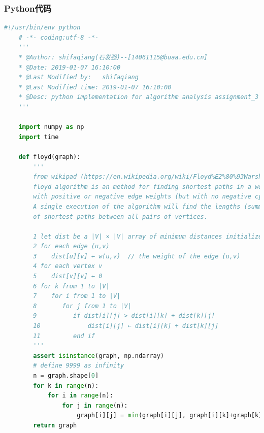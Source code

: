 \documentclass[a4paper,12pt]{article}
\begin{document}
\subsubsection{Python代码}
\begin{lstlisting}[language=Python]
    #!/usr/bin/env python
    # -*- coding:utf-8 -*-
    '''
    * @Author: shifaqiang(石发强)--[14061115@buaa.edu.cn] 
    * @Date: 2019-01-07 16:10:00 
    * @Last Modified by:   shifaqiang 
    * @Last Modified time: 2019-01-07 16:10:00 
    * @Desc: python implementation for algorithm analysis assignment_3
    '''

    import numpy as np
    import time

    def floyd(graph):
        '''
        from wikipad (https://en.wikipedia.org/wiki/Floyd%E2%80%93Warshall_algorithm),
        floyd algorithm is an method for finding shortest paths in a weighted graph 
        with positive or negative edge weights (but with no negative cycles).
        A single execution of the algorithm will find the lengths (summed weights) 
        of shortest paths between all pairs of vertices. 

        1 let dist be a |V| × |V| array of minimum distances initialized to ∞ (infinity)
        2 for each edge (u,v)
        3    dist[u][v] ← w(u,v)  // the weight of the edge (u,v)
        4 for each vertex v
        5    dist[v][v] ← 0
        6 for k from 1 to |V|
        7    for i from 1 to |V|
        8       for j from 1 to |V|
        9          if dist[i][j] > dist[i][k] + dist[k][j] 
        10             dist[i][j] ← dist[i][k] + dist[k][j]
        11         end if
        '''
        assert isinstance(graph, np.ndarray)
        # define 9999 as infinity
        n = graph.shape[0]
        for k in range(n):
            for i in range(n):
                for j in range(n):
                    graph[i][j] = min(graph[i][j], graph[i][k]+graph[k][j])
        return graph


\end{lstlisting}
\end{document}
